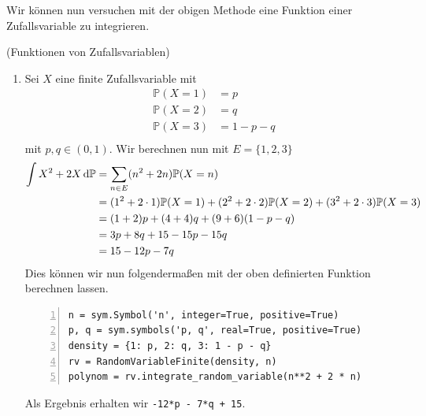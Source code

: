 \newpage

Wir können nun versuchen mit der obigen Methode eine Funktion einer Zufallsvariable zu integrieren.

\begin{Beispiel}{(Funktionen von Zufallsvariablen)}
\begin{enumerate}[label=(\roman*)]
\item Sei $X$ eine finite Zufallsvariable mit
\begin{align*}
\mathbb{P}(X = 1) &= p\\
\mathbb{P}(X = 2) &= q\\
\mathbb{P}(X = 3) &= 1 - p - q\\
\end{align*}
mit $p, q \in (0, 1)$. Wir berechnen nun mit $E = \{ 1, 2, 3 \}$
\begin{align*}
\int X^2 + 2 X \mathop{}\!\mathrm{d} \mathbb{P} &= \sum_{n \in E} (n^2 + 2 n) \mathbb{P}(X = n)\\
&= (1^2 + 2 \cdot 1) \mathbb{P}(X = 1) + (2^2 + 2 \cdot 2) \mathbb{P}(X = 2) + (3^2 + 2 \cdot 3) \mathbb{P}(X = 3)\\
&= (1 + 2) p + (4 + 4) q + (9 + 6) (1 - p - q)\\
&= 3 p + 8 q + 15 - 15 p - 15 q\\
&= 15 - 12 p - 7 q
\end{align*}
Dies können wir nun folgendermaßen mit der oben definierten Funktion berechnen lassen.
\begin{lstlisting}[numbers=left, numberstyle=\tiny\color{codegray}]
n = sym.Symbol('n', integer=True, positive=True)
p, q = sym.symbols('p, q', real=True, positive=True)
density = {1: p, 2: q, 3: 1 - p - q}
rv = RandomVariableFinite(density, n)
polynom = rv.integrate_random_variable(n**2 + 2 * n)
\end{lstlisting}
Als Ergebnis erhalten wir \lstinline|-12*p - 7*q + 15|.


\end{enumerate}
\end{Beispiel}
